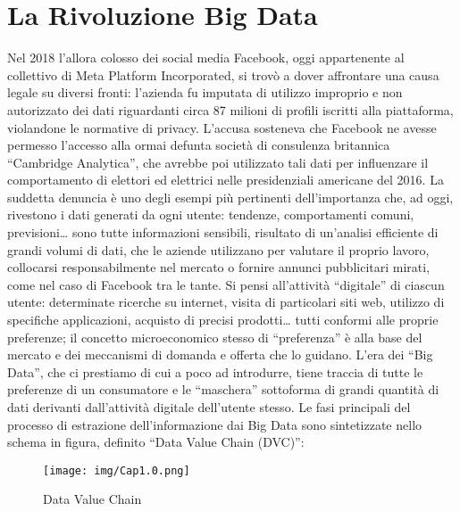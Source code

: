 \documentclass[a4paper,12pt]{report}
\begin{document}


\chapter{La Rivoluzione Big Data}
\fancyhead{} %
\fancyhead[R]{\thepage} %

Nel 2018 l’allora colosso dei social media Facebook, oggi appartenente al collettivo di Meta Platform Incorporated, si trovò a dover affrontare una causa legale su diversi fronti: l’azienda fu imputata di utilizzo improprio e non autorizzato dei dati riguardanti circa 87 milioni di profili iscritti alla piattaforma, violandone le normative di privacy. L’accusa sosteneva che Facebook ne avesse permesso l’accesso alla ormai defunta società di consulenza britannica “Cambridge Analytica”, che avrebbe poi utilizzato tali dati per influenzare il comportamento di elettori ed elettrici nelle presidenziali americane del 2016. La suddetta denuncia è uno degli esempi  più pertinenti dell’importanza che, ad oggi, rivestono i dati generati da ogni utente: tendenze, comportamenti comuni, previsioni… sono tutte informazioni sensibili, risultato di un’analisi efficiente di grandi volumi di dati, che le aziende utilizzano per valutare il proprio lavoro, collocarsi responsabilmente nel mercato o fornire annunci pubblicitari mirati, come nel caso di Facebook tra le tante. Si pensi all’attività “digitale” di ciascun utente: determinate ricerche su internet, visita di particolari siti web, utilizzo di specifiche applicazioni, acquisto di precisi prodotti… tutti conformi alle proprie preferenze; il concetto microeconomico stesso di “preferenza” è alla base del mercato e dei meccanismi di domanda e offerta che lo guidano. L’era dei “Big Data”, che ci prestiamo di cui a poco ad introdurre, tiene traccia di tutte le preferenze di un consumatore e le “maschera” sottoforma di grandi quantità di dati derivanti dall’attività digitale dell’utente stesso.
Le fasi principali del processo di estrazione dell’informazione dai Big Data sono sintetizzate nello schema in figura, definito “Data Value Chain (DVC)”:
\begin{figure}[h]
    \centering
    \texttt{[image: img/Cap1.0.png]}
    \caption{Data Value Chain}
\end{figure}
\end{document}
